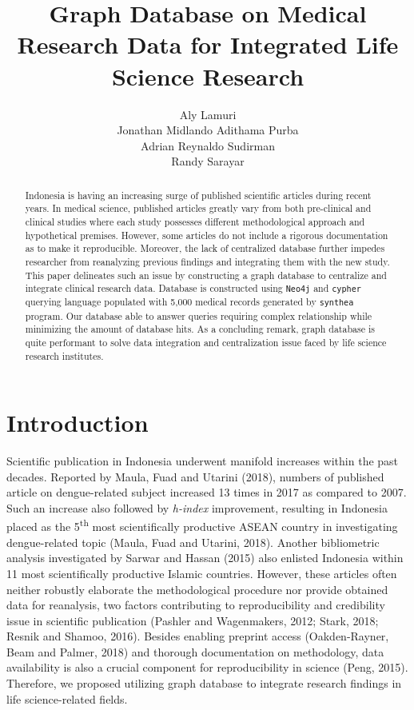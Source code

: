 \documentclass[]{article}
\title{Graph Database on Medical Research Data for Integrated Life Science
Research}
\author{Aly Lamuri \\ Jonathan Midlando Adithama Purba \\ Adrian Reynaldo Sudirman \\ Randy Sarayar}
\date{}
\begin{document}
\maketitle
\begin{abstract}
Indonesia is having an increasing surge of published scientific articles
during recent years. In medical science, published articles greatly vary
from both pre-clinical and clinical studies where each study possesses
different methodological approach and hypothetical premises. However,
some articles do not include a rigorous documentation as to make it
reproducible. Moreover, the lack of centralized database further impedes
researcher from reanalyzing previous findings and integrating them with
the new study. This paper delineates such an issue by constructing a
graph database to centralize and integrate clinical research data.
Database is constructed using \texttt{Neo4j} and \texttt{cypher}
querying language populated with 5,000 medical records generated by
\texttt{synthea} program. Our database able to answer queries requiring
complex relationship while minimizing the amount of database hits. As a
concluding remark, graph database is quite performant to solve data
integration and centralization issue faced by life science research
institutes.
\end{abstract}

\hypertarget{introduction}{%
\section{Introduction}\label{introduction}}

Scientific publication in Indonesia underwent manifold increases within
the past decades. Reported by Maula, Fuad and Utarini (2018), numbers of
published article on dengue-related subject increased 13 times in 2017
as compared to 2007. Such an increase also followed by \emph{h-index}
improvement, resulting in Indonesia placed as the 5\textsuperscript{th}
most scientifically productive ASEAN country in investigating
dengue-related topic (Maula, Fuad and Utarini, 2018). Another
bibliometric analysis investigated by Sarwar and Hassan (2015) also
enlisted Indonesia within 11 most scientifically productive Islamic
countries. However, these articles often neither robustly elaborate the
methodological procedure nor provide obtained data for reanalysis, two
factors contributing to reproducibility and credibility issue in
scientific publication (Pashler and Wagenmakers, 2012; Stark, 2018;
Resnik and Shamoo, 2016). Besides enabling preprint access
(Oakden-Rayner, Beam and Palmer, 2018) and thorough documentation on
methodology, data availability is also a crucial component for
reproducibility in science (Peng, 2015). Therefore, we proposed
utilizing graph database to integrate research findings in life
science-related fields.
\end{document}
